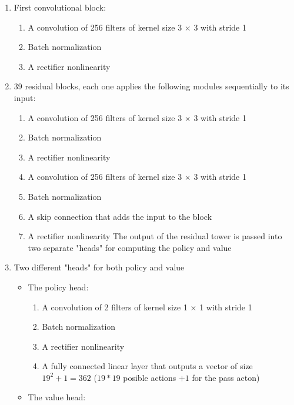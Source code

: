 \documentclass{article}
\begin{document}
\begin{enumerate}
	\item First convolutional block:
	\begin{enumerate}
		\item A convolution of 256 filters of kernel size 3 $\times$ 3 with stride 1
		\item Batch normalization
		\item A rectifier nonlinearity
	\end{enumerate}
	\item  39 residual blocks, each one applies the following modules sequentially to its input:
	\begin{enumerate}
		\item A convolution of 256 filters of kernel size 3 $\times$ 3 with stride 1
		\item Batch normalization
		\item A rectifier nonlinearity
		\item A convolution of 256 filters of kernel size 3 $\times$ 3 with stride 1
		\item Batch normalization
		\item A skip connection that adds the input to the block
		\item A rectifier nonlinearity
		The output of the residual tower is passed into two separate "heads" for computing the policy and value
	\end{enumerate}
	\item Two different "heads" for both policy and value
	\begin{itemize}
		\item The policy head:
		
		\begin{enumerate}
			\item A convolution of 2 filters of kernel size 1 $\times$ 1 with stride 1
			\item Batch normalization
			\item A rectifier nonlinearity
			\item A fully connected linear layer that outputs a vector of size $19^2 + 1 = 362$ ($19*19$ posible actions $+1$ for the pass acton)
		\end{enumerate}
		
		\item The value head:
		

\end{itemize}
\end{enumerate}
\end{document}

